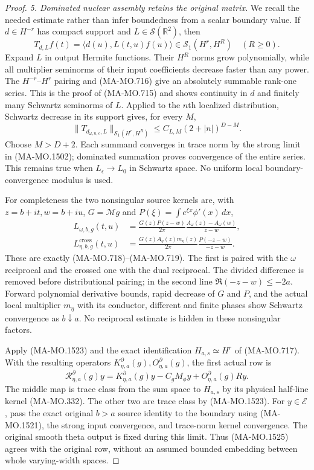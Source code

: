 \begin{proof}
\emph{5. Dominated nuclear assembly retains the original matrix.}
We recall the needed estimate rather than infer boundedness
from a scalar boundary value.  If $d\in H^{-r}$ has compact
support and $L\in\mathscr S(\mathbb R^2)$, then
\[
 T_{d,L}f(t)=\langle d(u),L(t,u)f(u)\rangle
       \in\mathcal S_1(H^r,H^R)\quad(R\ge0).
\tag{MA-MO.1522}
\]
Expand $L$ in output Hermite functions.  Their $H^R$ norms
grow polynomially, while all multiplier seminorms of their
input coefficients decrease faster than any power.  The
$H^{-r}$--$H^r$ pairing and (MA-MO.716) give an absolutely
summable rank-one series.  This is the proof of (MA-MO.715)
and shows continuity in $d$ and finitely many Schwartz
seminorms of $L$.  Applied to the $n$th localized distribution,
Schwartz decrease in its support gives, for every $M$,
\[
 \|T_{d_{\omega,n,\epsilon},L}\|_{\mathcal S_1(H^r,H^R)}
          \le C_{L,M}(2+|n|)^{D-M}.
\tag{MA-MO.1523}
\]
Choose $M>D+2$.  Each summand converges in trace norm by
the strong limit in (MA-MO.1502); dominated summation proves
convergence of the entire series.  This remains true when
$L_\epsilon\to L_0$ in Schwartz space.  No uniform local
boundary-convergence modulus is used.

For completeness the two nonsingular source kernels are,
with $z=b+it,w=b+iu$, $G=\mathcal Mg$ and
$P(\xi)=\int e^{\xi x}\phi'(x)\,dx$,
\[
\begin{aligned}
 L_{\omega,b,g}(t,u)
   &=\frac{G(z)P(z-w)}{2\pi}
                         \frac{A_\omega(z)-A_\omega(w)}{z-w},\\
 L^{\mathrm{cross}}_{\eta,b,g}(t,u)
   &=\frac{G(z)A_\eta(z)m_\eta(z)}{2\pi}
                                      \frac{P(-z-w)}{-z-w}.
\end{aligned}
\tag{MA-MO.1524}
\]
These are exactly (MA-MO.718)--(MA-MO.719).  The first
is paired with the $\omega$ reciprocal and the crossed
one with the dual reciprocal.  The divided difference
is removed before distributional pairing; in the second
line $\Re(-z-w)\le-2a$.  Forward polynomial derivative
bounds, rapid decrease of $G$ and $P$, and the actual
local multiplier $m_\eta$ with its conductor, different
and finite phases show Schwartz convergence as $b\downarrow a$.
No reciprocal estimate is hidden in these nonsingular factors.

Apply (MA-MO.1523) and the exact identification
$H_{a,s}\simeq H^r$ of (MA-MO.717).  With the resulting
operators $K_{\eta,a}^\partial(g),O_{\eta,a}^\partial(g)$,
the first actual row is
\[
 \mathscr R_{\eta,a}^\partial(g)y
       =K_{\eta,a}^\partial(g)y-C_gM_\phi y
                              +O_{\eta,a}^\partial(g)Ry .
\tag{MA-MO.1525}
\]
The middle map is trace class from the sum space to
$H_{a,s}$ by its physical half-line kernel (MA-MO.332).
The other two are trace class by (MA-MO.1523).
For $y\in\mathcal E$, pass the exact original $b>a$ source
identity to the boundary using (MA-MO.1521), the strong
input convergence, and trace-norm kernel convergence.
The original smooth theta output is fixed during this
limit.  Thus (MA-MO.1525) agrees with the original row,
without an assumed bounded embedding between whole
varying-width spaces.


\end{proof}
